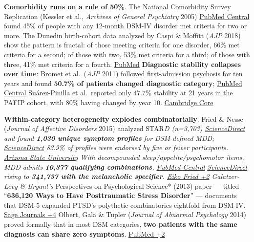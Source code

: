 \textbf{Comorbidity runs on a rule of 50\%}. The National Comorbidity Survey Replication (Kessler et al., \emph{Archives of General Psychiatry} 2005) \href{https://pmc.ncbi.nlm.nih.gov/articles/PMC2847357/}{PubMed Central} found 45\% of people with any 12-month DSM-IV disorder met criteria for two or more. The Dunedin birth-cohort data analyzed by Caspi \& Moffitt (\emph{AJP} 2018) show the pattern is fractal: of those meeting criteria for one disorder, 66\% met criteria for a second; of those with two, 53\% met criteria for a third; of those with three, 41\% met criteria for a fourth. \href{https://pubmed.ncbi.nlm.nih.gov/29621902/}{PubMed} \textbf{Diagnostic stability collapses over time}: Bromet et al.~(\emph{AJP} 2011) followed first-admission psychosis for ten years and found \textbf{50.7\% of patients changed diagnostic category}; \href{https://pmc.ncbi.nlm.nih.gov/articles/PMC3589618/}{PubMed Central} Suárez-Pinilla et al.~reported only 47.7\% stability at 21 years in the PAFIP cohort, with 80\% having changed by year 10. \href{https://www.cambridge.org/core/journals/psychological-medicine/article/abs/longterm-diagnostic-stability-predictors-of-diagnostic-change-and-time-until-diagnostic-change-of-firstepisode-psychosis-a-21year-followup-study/2D7A6A5775A2AEA714260DC85BB4A19D}{Cambridge Core}

\textbf{Within-category heterogeneity explodes combinatorially}. Fried \& Nesse (\emph{Journal of Affective Disorders} 2015) analyzed STAR\emph{D (n=3,703) \href{https://www.sciencedirect.com/science/article/abs/pii/S0165032714006326}{ScienceDirect} and found \textbf{1,030 unique symptom profiles} for DSM-defined MDD; \href{https://www.sciencedirect.com/science/article/abs/pii/S027273582100043X}{ScienceDirect} 83.9\% of profiles were endorsed by five or fewer participants. \href{https://asu.elsevierpure.com/en/publications/depression-is-not-a-consistent-syndrome-an-investigation-of-uniqu/}{Arizona State University} With decompounded sleep/appetite/psychomotor items, MDD admits \textbf{10,377 qualifying combinations}, \href{https://pmc.ncbi.nlm.nih.gov/articles/PMC4397113/}{PubMed Central} \href{https://www.sciencedirect.com/science/article/pii/S0278584620304498}{ScienceDirect} rising to \textbf{341,737 with the melancholic specifier}. \href{https://eiko-fried.com/10377-ways-for-major-depression-but-341737-ways-for-melancholia/}{Eiko Fried +2} Galatzer-Levy \& Bryant's }Perspectives on Psychological Science* (2013) paper --- titled ``\textbf{636,120 Ways to Have Posttraumatic Stress Disorder}'' --- documents that DSM-5 expanded PTSD's polythetic combinatorics eightfold from DSM-IV. \href{https://journals.sagepub.com/doi/abs/10.1177/1745691613504115}{Sage Journals +4} Olbert, Gala \& Tupler (\emph{Journal of Abnormal Psychology} 2014) proved formally that in most DSM categories, \textbf{two patients with the same diagnosis can share zero symptoms}. \href{https://pubmed.ncbi.nlm.nih.gov/24886017/}{PubMed +2}

